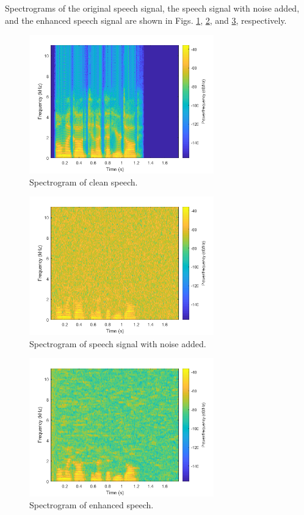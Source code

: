 \documentclass[letterpaper]{article}
\begin{document}


Spectrograms of the original speech signal, the speech signal with noise added, and the enhanced speech signal are shown in Figs. \ref{fig:p4clean}, \ref{fig:p4noise}, and \ref{fig:p4enhan}, respectively.

\begin{figure}[h!]
    \centering
    \includegraphics[width=8cm]{ee599hw5p4-1.png}
    \caption{Spectrogram of clean speech.}
    \label{fig:p4clean}
\end{figure}

\begin{figure}[h!]
    \centering
    \includegraphics[width=8cm]{ee599hw5p4-2.png}
    \caption{Spectrogram of speech signal with noise added.}
    \label{fig:p4noise}
\end{figure}

\begin{figure}[h!]
    \centering
    \includegraphics[width=8cm]{ee599hw5p4-3.png}
    \caption{Spectrogram of enhanced speech.}
    \label{fig:p4enhan}
\end{figure}

\newpage



\end{document}
